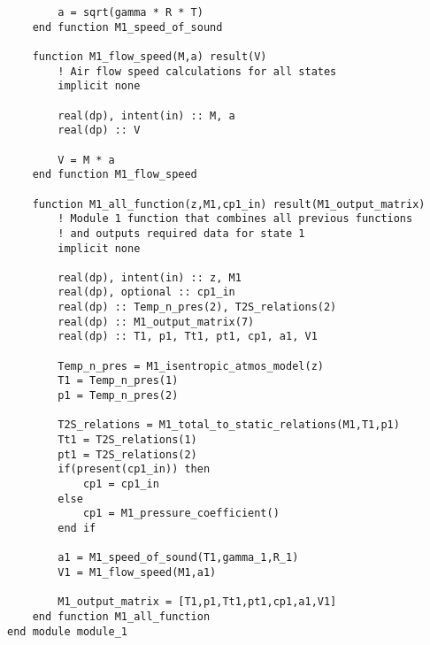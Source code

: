 \begin{verbatim}
        a = sqrt(gamma * R * T)
    end function M1_speed_of_sound

    function M1_flow_speed(M,a) result(V)
        ! Air flow speed calculations for all states
        implicit none

        real(dp), intent(in) :: M, a
        real(dp) :: V
        
        V = M * a
    end function M1_flow_speed

    function M1_all_function(z,M1,cp1_in) result(M1_output_matrix)
        ! Module 1 function that combines all previous functions
        ! and outputs required data for state 1
        implicit none

        real(dp), intent(in) :: z, M1
        real(dp), optional :: cp1_in
        real(dp) :: Temp_n_pres(2), T2S_relations(2)
        real(dp) :: M1_output_matrix(7)
        real(dp) :: T1, p1, Tt1, pt1, cp1, a1, V1

        Temp_n_pres = M1_isentropic_atmos_model(z)
        T1 = Temp_n_pres(1)
        p1 = Temp_n_pres(2)
        
        T2S_relations = M1_total_to_static_relations(M1,T1,p1)
        Tt1 = T2S_relations(1)
        pt1 = T2S_relations(2)
        if(present(cp1_in)) then
            cp1 = cp1_in
        else
            cp1 = M1_pressure_coefficient()
        end if

        a1 = M1_speed_of_sound(T1,gamma_1,R_1)
        V1 = M1_flow_speed(M1,a1)

        M1_output_matrix = [T1,p1,Tt1,pt1,cp1,a1,V1]
    end function M1_all_function
end module module_1
\end{verbatim}